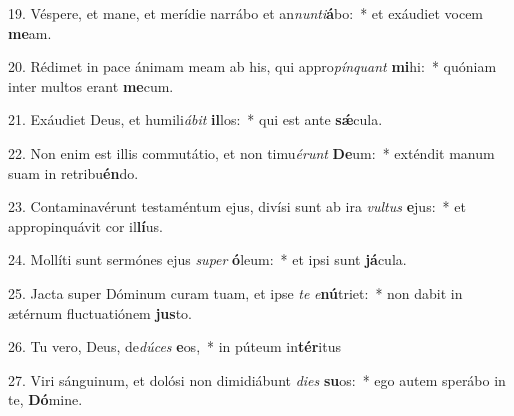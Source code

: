 19. Véspere, et mane, et merídie narrábo et an\textit{nun}\textit{ti}\textbf{á}bo:~*  et exáudiet vocem \textbf{me}am.\

20. Rédimet in pace ánimam meam ab his, qui appro\textit{pín}\textit{quant} \textbf{mi}hi:~*  quóniam inter multos erant \textbf{me}cum.\

21. Exáudiet Deus, et humili\textit{á}\textit{bit} \textbf{il}los:~*  qui est ante \textbf{sǽ}cula.\

22. Non enim est illis commutátio, et non timu\textit{é}\textit{runt} \textbf{De}um:~*  exténdit manum suam in retribu\textbf{én}do.\

23. Contaminavérunt testaméntum ejus, divísi sunt ab ira \textit{vul}\textit{tus} \textbf{e}jus:~*  et appropinquávit cor il\textbf{lí}us.\

24. Mollíti sunt sermónes ejus \textit{su}\textit{per} \textbf{ó}leum:~*  et ipsi sunt \textbf{já}cula.\

25. Jacta super Dóminum curam tuam, et ipse \textit{te} \textit{e}\textbf{nú}triet:~*  non dabit in ætérnum fluctuatiónem \textbf{jus}to.\

26. Tu vero, Deus, de\textit{dú}\textit{ces} \textbf{e}os,~*  in púteum in\textbf{tér}itus\

27. Viri sánguinum, et dolósi non dimidiábunt \textit{di}\textit{es} \textbf{su}os:~*  ego autem sperábo in te, \textbf{Dó}mine.\

